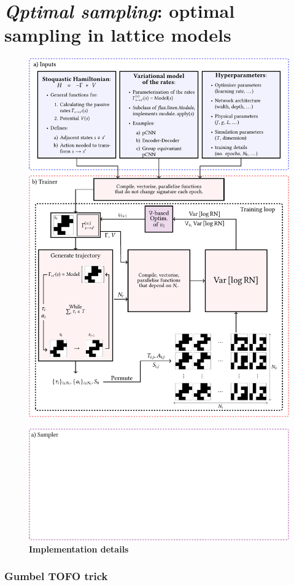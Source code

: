 \section[\emph{Qptimal sampling}]{\emph{Qptimal sampling}: optimal sampling in lattice models}
\label{sec:qoptsampl}
\begin{figure}[h]
	\centering
	\includegraphics[width=\linewidth]{Chapter4/Figs/Vector/qsampl1}
\end{figure}
\begin{figure}[t]
	\ContinuedFloat
	\centering
	\includegraphics[width=\linewidth]{Chapter4/Figs/Vector/qsampl2}
	\caption[Implementation details]{\textbf{Implementation details}}
	\label{fig:qsampl}
\end{figure}

\subsubsection{Gumbel TOFO trick}


